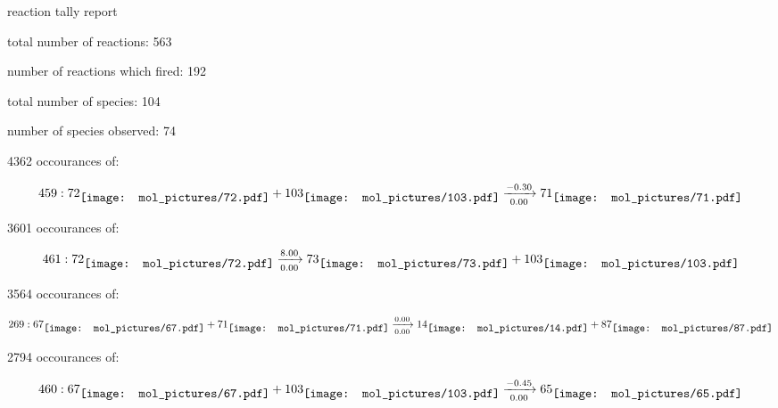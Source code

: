 \documentclass{article}
\begin{document}
\setlength\parindent{0pt}


reaction tally report



total number of reactions: 563



number of reactions which fired: 192



total number of species: 104



number of species observed: 74



4362 occourances of:

$$
459:  
72
\raisebox{-.5\height}{\texttt{[image: mol\_pictures/72.pdf]}}
+
103
\raisebox{-.5\height}{\texttt{[image: mol\_pictures/103.pdf]}}
\xrightarrow[0.00]{-0.30}
71
\raisebox{-.5\height}{\texttt{[image: mol\_pictures/71.pdf]}}
$$



\vspace{1cm}


3601 occourances of:

$$
461:  
72
\raisebox{-.5\height}{\texttt{[image: mol\_pictures/72.pdf]}}
\xrightarrow[0.00]{8.00}
73
\raisebox{-.5\height}{\texttt{[image: mol\_pictures/73.pdf]}}
+
103
\raisebox{-.5\height}{\texttt{[image: mol\_pictures/103.pdf]}}
$$



\vspace{1cm}


3564 occourances of:

$$
269:  
67
\raisebox{-.5\height}{\texttt{[image: mol\_pictures/67.pdf]}}
+
71
\raisebox{-.5\height}{\texttt{[image: mol\_pictures/71.pdf]}}
\xrightarrow[0.00]{0.00}
14
\raisebox{-.5\height}{\texttt{[image: mol\_pictures/14.pdf]}}
+
87
\raisebox{-.5\height}{\texttt{[image: mol\_pictures/87.pdf]}}
$$



\vspace{1cm}


2794 occourances of:

$$
460:  
67
\raisebox{-.5\height}{\texttt{[image: mol\_pictures/67.pdf]}}
+
103
\raisebox{-.5\height}{\texttt{[image: mol\_pictures/103.pdf]}}
\xrightarrow[0.00]{-0.45}
65
\raisebox{-.5\height}{\texttt{[image: mol\_pictures/65.pdf]}}
$$
\end{document}

